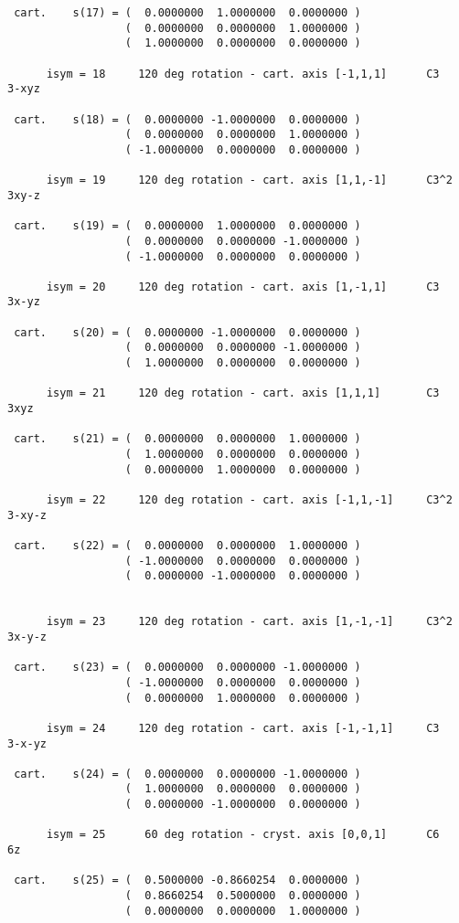 \documentclass[12pt,a4paper,twoside]{report}
\begin{document}
\begin{tcolorbox}
\begin{scriptsize}
\begin{verbatim}
 cart.    s(17) = (  0.0000000  1.0000000  0.0000000 )
                  (  0.0000000  0.0000000  1.0000000 )
                  (  1.0000000  0.0000000  0.0000000 )

      isym = 18     120 deg rotation - cart. axis [-1,1,1]      C3     3-xyz

 cart.    s(18) = (  0.0000000 -1.0000000  0.0000000 )
                  (  0.0000000  0.0000000  1.0000000 )
                  ( -1.0000000  0.0000000  0.0000000 )

      isym = 19     120 deg rotation - cart. axis [1,1,-1]      C3^2   3xy-z

 cart.    s(19) = (  0.0000000  1.0000000  0.0000000 )
                  (  0.0000000  0.0000000 -1.0000000 )
                  ( -1.0000000  0.0000000  0.0000000 )

      isym = 20     120 deg rotation - cart. axis [1,-1,1]      C3     3x-yz

 cart.    s(20) = (  0.0000000 -1.0000000  0.0000000 )
                  (  0.0000000  0.0000000 -1.0000000 )
                  (  1.0000000  0.0000000  0.0000000 )

      isym = 21     120 deg rotation - cart. axis [1,1,1]       C3     3xyz

 cart.    s(21) = (  0.0000000  0.0000000  1.0000000 )
                  (  1.0000000  0.0000000  0.0000000 )
                  (  0.0000000  1.0000000  0.0000000 )

      isym = 22     120 deg rotation - cart. axis [-1,1,-1]     C3^2   3-xy-z

 cart.    s(22) = (  0.0000000  0.0000000  1.0000000 )
                  ( -1.0000000  0.0000000  0.0000000 )
                  (  0.0000000 -1.0000000  0.0000000 )


      isym = 23     120 deg rotation - cart. axis [1,-1,-1]     C3^2   3x-y-z

 cart.    s(23) = (  0.0000000  0.0000000 -1.0000000 )
                  ( -1.0000000  0.0000000  0.0000000 )
                  (  0.0000000  1.0000000  0.0000000 )

      isym = 24     120 deg rotation - cart. axis [-1,-1,1]     C3     3-x-yz

 cart.    s(24) = (  0.0000000  0.0000000 -1.0000000 )
                  (  1.0000000  0.0000000  0.0000000 )
                  (  0.0000000 -1.0000000  0.0000000 )

      isym = 25      60 deg rotation - cryst. axis [0,0,1]      C6     6z

 cart.    s(25) = (  0.5000000 -0.8660254  0.0000000 )
                  (  0.8660254  0.5000000  0.0000000 )
                  (  0.0000000  0.0000000  1.0000000 )


\end{verbatim}
\end{scriptsize}
\end{tcolorbox}
\end{document}
